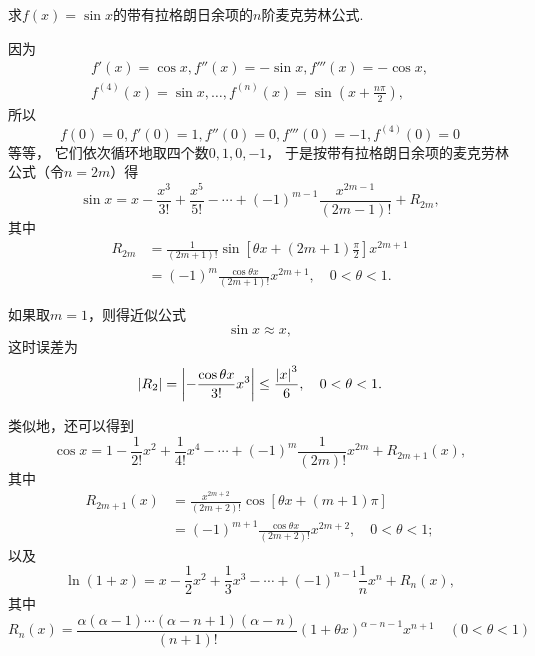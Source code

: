 \begin{example}
求\(f(x)=\sin x\)的带有拉格朗日余项的\(n\)阶麦克劳林公式.
\begin{solution}
因为\begin{align*}
	f'(x)=\cos x,
	f''(x)=-\sin x,
	f'''(x)=-\cos x, \\
	f^{(4)}(x)=\sin x,
	\dotsc,
	f^{(n)}(x)=\sin\left(x+\frac{n\pi}{2}\right),
\end{align*}
所以\begin{equation*}
	f(0)=0,f'(0)=1,f''(0)=0,f'''(0)=-1,f^{(4)}(0)=0
\end{equation*}等等，
它们依次循环地取四个数\(0,1,0,-1\)，
于是按带有拉格朗日余项的麦克劳林公式（令\(n=2m\)）得\begin{equation*}
	\sin x = x - \frac{x^3}{3!} + \frac{x^5}{5!} - \dotsb + (-1)^{m-1} \frac{x^{2m-1}}{(2m-1)!} + R_{2m},
\end{equation*}
其中\begin{align*}
	R_{2m}
	&= \frac{1}{(2m+1)!} \sin\left[\theta x + (2m+1)\frac{\pi}{2}\right] x^{2m+1} \\
	&= (-1)^m \frac{\cos \theta x}{(2m+1)!} x^{2m+1},
	\quad 0<\theta<1.
\end{align*}

如果取\(m=1\)，则得近似公式\begin{equation*}
	\sin x \approx x,
\end{equation*}
这时误差为\begin{equation*}
	\abs{R_2} = \abs{-\frac{\cos \theta x}{3!} x^3}
	\leq \frac{\abs{x}^3}{6},
	\quad 0<\theta<1.
\end{equation*}
\end{solution}
\end{example}

类似地，还可以得到\begin{equation*}%
	\cos x
	= 1 - \frac{1}{2!} x^2
		+ \frac{1}{4!} x^4 - \dotsb
		+ (-1)^m \frac{1}{(2m)!} x^{2m}
		+ R_{2m+1}(x),
\end{equation*}
其中\begin{align*}%
	R_{2m+1}(x)
	&= \frac{x^{2m+2}}{(2m+2)!} \cos\left[\theta x + (m+1)\pi\right] \\
	&= (-1)^{m+1} \frac{\cos \theta x}{(2m+2)!} x^{2m+2},
	\quad 0<\theta<1;
\end{align*}
以及\begin{equation*}%
	\ln(1+x)
	= x - \frac{1}{2} x^2 + \frac{1}{3} x^3 - \dotsb
		+ (-1)^{n-1} \frac{1}{n} x^n + R_n(x),
\end{equation*}
其中\begin{equation*}%
	R_n(x) = \frac{\alpha(\alpha-1)\dotsm(\alpha-n+1)(\alpha-n)}{(n+1)!}
	(1+\theta x)^{\alpha-n-1} x^{n+1}
	\quad(0<\theta<1)
\end{equation*}

